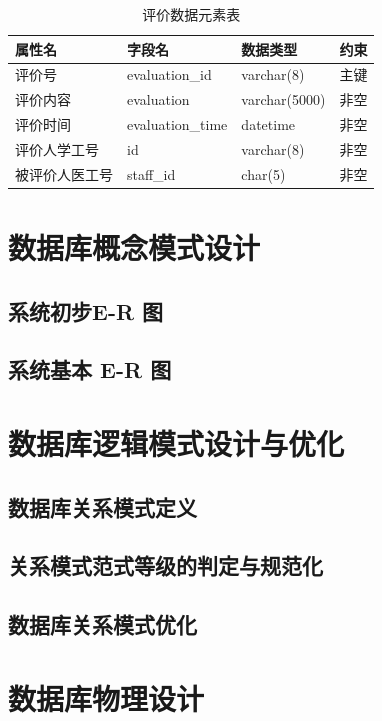 \documentclass{article}
\begin{document}
\begin{table}[H]
    \centering
    \begin{tabularx}{\textwidth}{|>{\raggedright\arraybackslash}X|>{\raggedright\arraybackslash}X|>{\raggedright\arraybackslash}X|>{\raggedright\arraybackslash}X|}
    \toprule
    \textbf{属性名} & \textbf{字段名} & \textbf{数据类型} & \textbf{约束} \\ \midrule
    评价号 & evaluation\_id & varchar(8) & 主键 \\ \midrule
    评价内容 & evaluation & varchar(5000) & 非空 \\ \midrule
    评价时间 & evaluation\_time & datetime & 非空 \\ \midrule
    评价人学工号 & id & varchar(8) & 非空 \\ \midrule
    被评价人医工号 & staff\_id & char(5) & 非空 \\ \bottomrule
    \end{tabularx}
    \caption{评价数据元素表}
    \label{tab:evaluation_elements}
\end{table}

\section{数据库概念模式设计}
\subsection{系统初步E-R 图}

\subsection{系统基本 E-R 图}

\section{数据库逻辑模式设计与优化}
\subsection{数据库关系模式定义}

\subsection{关系模式范式等级的判定与规范化}

\subsection{数据库关系模式优化}

\section{数据库物理设计}
\end{document}
